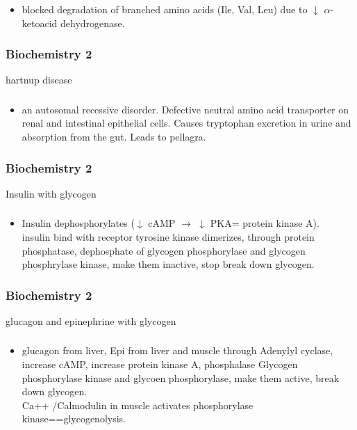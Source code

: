 \documentclass[11pt]{beamer}
\begin{document}
\begin{frame}
 \frametitle{}
\begin{itemize}
\item blocked degradation of branched amino acids (Ile, Val, Leu) due to ${\downarrow}$ ${\alpha}$-ketoacid dehydrogenase.
\end{itemize}
\end{frame}

\begin{frame}
 \frametitle{Biochemistry 2}
hartnup disease 
\end{frame}

\begin{frame}
 \frametitle{}
\begin{itemize}
\item an autosomal recessive disorder. Defective neutral amino acid transporter on renal and intestinal epithelial cells. Causes tryptophan excretion in urine and absorption from the gut. Leads to pellagra. 
\end{itemize}
\end{frame}

\begin{frame}
 \frametitle{Biochemistry 2}
Insulin with glycogen 
\end{frame}

\begin{frame}
 \frametitle{}
\begin{itemize}
\item Insulin dephosphorylates (${\downarrow}$ cAMP ${\rightarrow}$ ${\downarrow}$ PKA= protein kinase A). \\ insulin bind with receptor tyrosine kinase dimerizes, through protein phosphatase, dephosphate of glycogen phosphorylase and glycogen phosphrylase kinase, make them inactive, stop break down glycogen. 
\end{itemize}
\end{frame}

\begin{frame}
 \frametitle{Biochemistry 2}
glucagon and epinephrine with glycogen 
\end{frame}

\begin{frame}
 \frametitle{}
\begin{itemize}
\item glucagon from liver, Epi from liver and muscle through Adenylyl cyclase, increase cAMP, increase protein kinase A, phosphalase Glycogen phosphorylase kinase and glycoen phosphorylase, make them active, break down glycogen.  \\ Ca++ /Calmodulin in muscle activates phosphorylase kinase==glycogenolysis. 
\end{itemize}
\end{frame}
\end{document}
